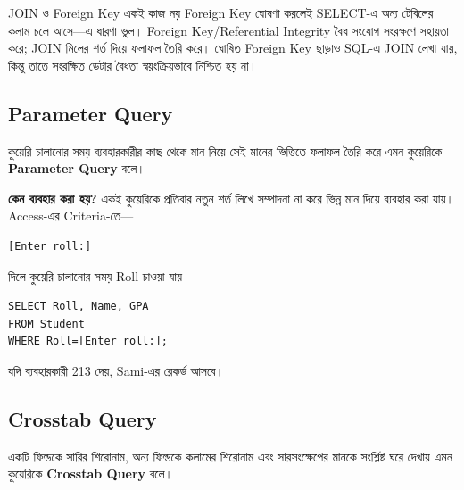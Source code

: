\begin{mistakebox}{JOIN ও Foreign Key একই কাজ নয়}
Foreign Key ঘোষণা করলেই SELECT-এ অন্য টেবিলের কলাম চলে আসে—এ ধারণা
ভুল। Foreign Key/Referential Integrity বৈধ সংযোগ সংরক্ষণে সহায়তা করে;
JOIN মিলের শর্ত দিয়ে ফলাফল তৈরি করে। ঘোষিত Foreign Key ছাড়াও SQL-এ
JOIN লেখা যায়, কিন্তু তাতে সংরক্ষিত ডেটার বৈধতা স্বয়ংক্রিয়ভাবে নিশ্চিত হয় না।
\end{mistakebox}


\subsection{Parameter Query}

\begin{definitionbox}{}

কুয়েরি চালানোর সময় ব্যবহারকারীর কাছ থেকে মান নিয়ে সেই মানের
ভিত্তিতে ফলাফল তৈরি করে এমন কুয়েরিকে
\textbf{Parameter Query} বলে।

\end{definitionbox}

\textbf{কেন ব্যবহার করা হয়?} একই কুয়েরিকে প্রতিবার নতুন শর্ত লিখে সম্পাদনা না করে ভিন্ন মান
দিয়ে ব্যবহার করা যায়। Access-এর Criteria-তে—

\par\noindent\begin{minipage}{\linewidth}
\begin{verbatim}
[Enter roll:]
\end{verbatim}
\end{minipage}\par

দিলে কুয়েরি চালানোর সময় Roll চাওয়া যায়।

\par\noindent\begin{minipage}{\linewidth}
\begin{verbatim}
SELECT Roll, Name, GPA
FROM Student
WHERE Roll=[Enter roll:];
\end{verbatim}
\end{minipage}\par

যদি ব্যবহারকারী 213 দেয়, Sami-এর রেকর্ড আসবে।

\subsection{Crosstab Query}

\begin{definitionbox}{}

একটি ফিল্ডকে সারির শিরোনাম, অন্য ফিল্ডকে কলামের শিরোনাম এবং
সারসংক্ষেপের মানকে সংশ্লিষ্ট ঘরে দেখায় এমন কুয়েরিকে
\textbf{Crosstab Query} বলে।

\end{definitionbox}

